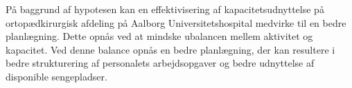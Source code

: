 På baggrund af hypotesen kan en effektivisering af kapacitetsudnyttelse på ortopædkirurgisk afdeling på Aalborg Universitetshospital medvirke til en bedre planlægning. Dette opnås ved at mindske ubalancen mellem aktivitet og kapacitet. Ved denne balance opnås en bedre planlægning, der kan resultere i bedre strukturering af personalets arbejdsopgaver og bedre udnyttelse af disponible sengepladser. 






